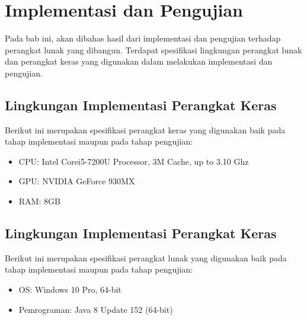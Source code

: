 \chapter{Implementasi dan Pengujian}
Pada bab ini, akan dibahas hasil dari implementasi dan pengujian terhadap perangkat lunak yang dibangun. Terdapat spesifikasi lingkungan perangkat lunak dan perangkat keras yang digunakan dalam melakukan implementasi dan pengujian.

\section{Lingkungan Implementasi Perangkat Keras}
Berikut ini merupakan spesifikasi perangkat keras yang digunakan baik pada tahap implementasi maupun pada tahap pengujian:
\begin{itemize}
	\item CPU: Intel\textsuperscript{\textregistered}{ }Core\texttrademark{ }i5-7200U Processor, 3M Cache, up to 3.10 Ghz
	\item GPU: NVIDIA GeForce 930MX
	\item RAM: 8GB
\end{itemize}

\section{Lingkungan Implementasi Perangkat Keras}
Berikut ini merupakan spesifikasi perangkat lunak yang digunakan baik pada tahap implementasi maupun pada tahap pengujian:
\begin{itemize}
	\item OS: Windows 10 Pro, 64-bit
	\item Pemrograman: Java 8 Update 152 (64-bit)
\end{itemize}

